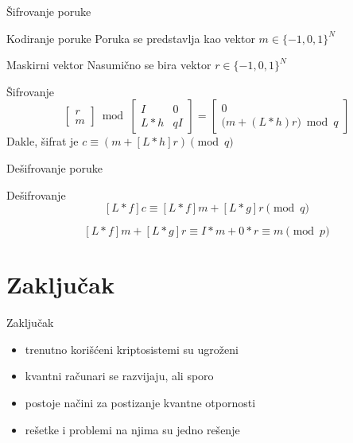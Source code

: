 \documentclass[aspectratio=1610]{beamer}
\begin{document}
\begin{frame}{Šifrovanje poruke}
    \begin{block}{Kodiranje poruke}
        Poruka se predstavlja kao vektor $m \in \{-1,0,1\}^N$
    \end{block}

    \begin{exampleblock}{Maskirni vektor}
        Nasumično se bira vektor $r \in \{-1,0,1\}^N$
    \end{exampleblock}

    \begin{alertblock}{Šifrovanje}
        \[
        \begin{bmatrix}
            r \\
            m
        \end{bmatrix}
        \bmod
        \begin{bmatrix}
            I & 0 \\
            L \ast h & qI
        \end{bmatrix}
        =
        \begin{bmatrix}
            0 \\
            \bigl(m + (L \ast h)r\bigr) \bmod q
        \end{bmatrix}
        \]
    Dakle, šifrat je $c \equiv (m + [L \ast h]r) \pmod q$
    \end{alertblock}
\end{frame}

\begin{frame}{Dešifrovanje poruke}
    \begin{block}{Dešifrovanje}
        \[[L\ast f]c \equiv [L\ast f]m + [L\ast g]r \pmod q\]

        \[[L \ast f ]m + [L \ast g]r \equiv I \ast m + 0\ast r \equiv m \pmod p \]
    \end{block} 
\end{frame}

\section{Zaključak}
\begin{frame}{Zaključak}

\begin{itemize}
    \item trenutno korišćeni kriptosistemi su ugroženi
    \item kvantni računari se razvijaju, ali sporo
    \item postoje načini za postizanje kvantne otpornosti
    \item rešetke i problemi na njima su jedno rešenje
\end{itemize}
    
\end{frame}

\end{document}
